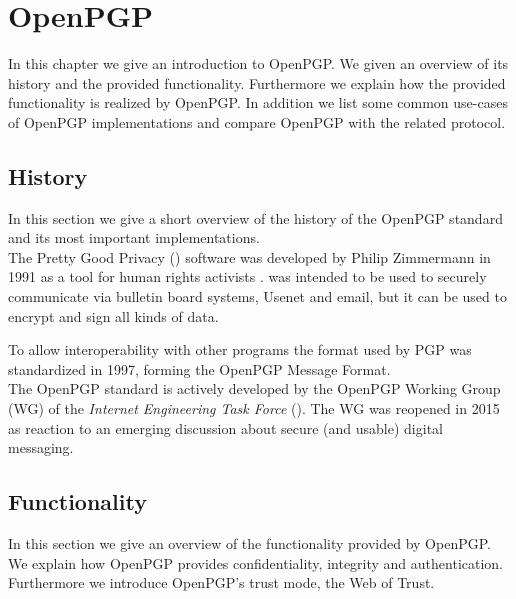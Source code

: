 \chapter{OpenPGP} \label{chapter:openpgp}

In this chapter we give an introduction to OpenPGP. We given an overview of its history and the provided functionality. Furthermore we explain how the provided functionality is realized by OpenPGP. In addition we list some common use-cases of OpenPGP implementations and compare OpenPGP with the related  protocol. 


\section{History}  \label{section:openpgp:history}

In this section we give a short overview of the history of the OpenPGP standard and its most important implementations. \\


The Pretty Good Privacy () software was developed by Philip Zimmermann in 1991 \cite{PGP1} as a tool for human rights activists \cite{PGP2}.  was intended to be used to securely communicate via bulletin board systems, Usenet and email, but it can be used to encrypt and sign all kinds of data.

To allow interoperability with other programs the format used by PGP was standardized in 1997, forming the OpenPGP Message Format. \\


The OpenPGP standard is actively developed by the OpenPGP Working Group (WG) of the \textit{Internet Engineering Task Force} (). The WG was reopened in 2015 as reaction to an emerging discussion about secure (and usable) digital messaging.

\section{Functionality} \label{section:openpgp:functionality}

In this section we give an overview of the functionality provided by OpenPGP. We explain how OpenPGP provides confidentiality, integrity
and authentication. Furthermore we introduce OpenPGP's trust mode, the Web of Trust.  \\


